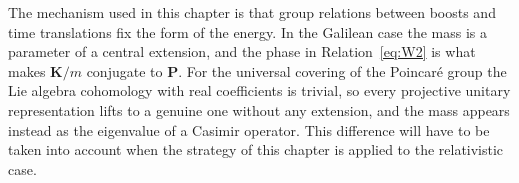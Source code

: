 \begin{remark}[Outlook]\label{rem:outlook}
	The mechanism used in this chapter is that group relations between boosts and time translations fix the form of the energy. In the Galilean case the mass is a parameter of a central extension, and the phase in Relation~\eqref{eq:W2} is what makes $\mathbf{K}/m$ conjugate to $\mathbf{P}$. For the universal covering of the Poincaré group the Lie algebra cohomology with real coefficients is trivial, so every projective unitary representation lifts to a genuine one without any extension, and the mass appears instead as the eigenvalue of a Casimir operator. This difference will have to be taken into account when the strategy of this chapter is applied to the relativistic case.
\end{remark}


